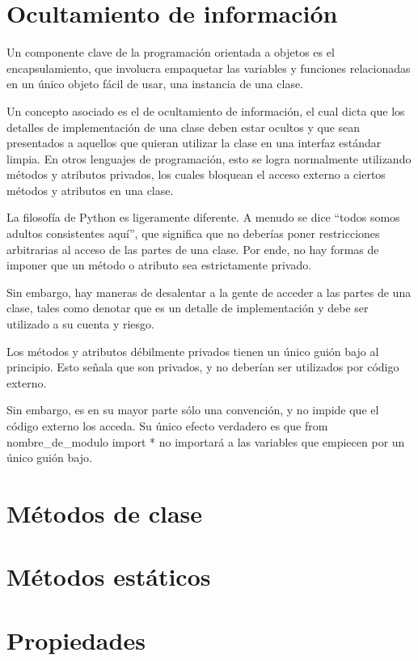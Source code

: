 \documentclass{report}
\newcommand{\doble}[1]{``#1''}
\begin{document}
{\section{Ocultamiento de información}

Un componente clave de la programación orientada a objetos es el encapsulamiento, que involucra empaquetar las variables y funciones relacionadas en un único objeto fácil de usar, una instancia de una clase.

Un concepto asociado es el de ocultamiento de información, el cual dicta que los detalles de implementación de una clase deben estar ocultos y que sean presentados a aquellos que quieran utilizar la clase en una interfaz estándar limpia. En otros lenguajes de programación, esto se logra normalmente utilizando métodos y atributos privados, los cuales bloquean el acceso externo a ciertos métodos y atributos en una clase.

La filosofía de Python es ligeramente diferente. A menudo se dice \doble{todos somos adultos consistentes aquí}, que significa que no deberías poner restricciones arbitrarias al acceso de las partes de una clase. Por ende, no hay formas de imponer que un método o atributo sea estrictamente privado.

Sin embargo, hay maneras de desalentar a la gente de acceder a las partes de una clase, tales como denotar que es un detalle de implementación y debe ser utilizado a su cuenta y riesgo.

Los métodos y atributos débilmente privados tienen un único guión bajo al principio. Esto señala que son privados, y no deberían ser utilizados por código externo.

Sin embargo, es en su mayor parte sólo una convención, y no impide que el código externo los acceda. Su único efecto verdadero es que from nombre_de_modulo import * no importará a las variables que empiecen por un único guión bajo.

\section{Métodos de clase}

\section{Métodos estáticos}

\section{Propiedades}

}
\end{document}
